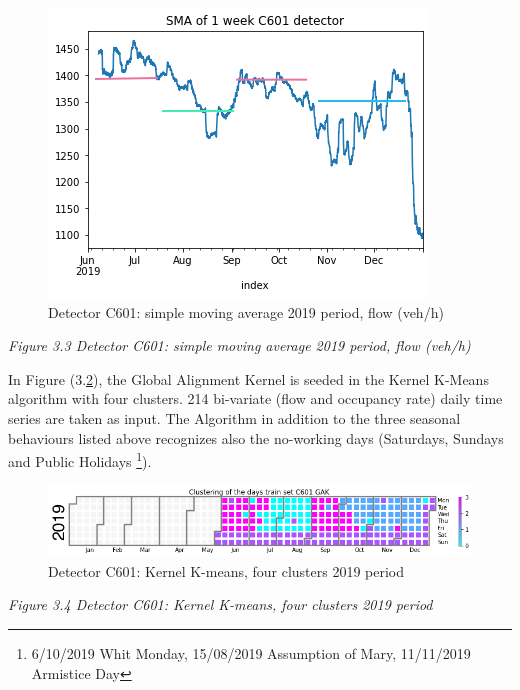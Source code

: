 \documentclass[11pt]{article}
\begin{document}
    \begin{figure}
    \centering
    \includegraphics[scale=0.5]{SMA C601 2019.png}
    \caption{Detector C601: simple moving average 2019 period, flow (veh/h)}
    \label{fig:3.3}
\end{figure}

\emph{\small Figure 3.3 Detector C601: simple moving average 2019 period, flow (veh/h)}

    In Figure (3.\ref{fig:3.4}), the Global Alignment Kernel is seeded in
the Kernel K-Means algorithm with four clusters. 214 bi-variate (flow
and occupancy rate) daily time series are taken as input. The Algorithm
in addition to the three seasonal behaviours listed above recognizes
also the no-working days (Saturdays, Sundays and Public Holidays
\footnote{6/10/2019 Whit Monday, 15/08/2019 
Assumption of Mary, 11/11/2019 
Armistice Day}).

    \begin{figure}
    \centering
    \includegraphics{GAK C601 2019 K=4.png}
    \caption{Detector C601: Kernel K-means, four clusters 2019 period}
    \label{fig:3.4}
\end{figure}

\emph{\small Figure 3.4 Detector C601: Kernel K-means, four clusters 2019 period}
\end{document}
